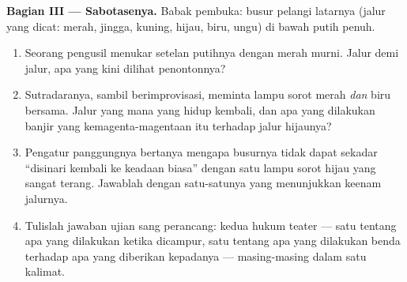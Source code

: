 \begin{problem}
\medskip\noindent\textbf{Bagian III --- Sabotasenya.}
Babak pembuka: busur pelangi latarnya (jalur yang dicat: merah,
jingga, kuning, hijau, biru, ungu) di bawah  putih penuh.
\begin{enumerate}[resume]
  \item Seorang pengusil menukar setelan putihnya dengan merah murni.
        Jalur demi jalur, apa yang kini dilihat penontonnya?
  \item Sutradaranya, sambil berimprovisasi, meminta lampu sorot
        merah \emph{dan} biru bersama. Jalur yang mana yang hidup
        kembali, dan apa yang dilakukan banjir yang kemagenta-magentaan
        itu terhadap jalur hijaunya?
  \item Pengatur panggungnya bertanya mengapa busurnya tidak dapat
        sekadar ``disinari kembali ke keadaan biasa'' dengan satu
        lampu sorot hijau yang sangat terang. Jawablah dengan
        satu-satunya  yang menunjukkan keenam jalurnya.
  \item Tulislah jawaban ujian sang perancang: kedua hukum teater
         --- satu tentang apa yang dilakukan  ketika
        dicampur, satu tentang apa yang dilakukan benda terhadap apa
        yang diberikan kepadanya --- masing-masing dalam satu kalimat.
\end{enumerate}
\end{problem}
